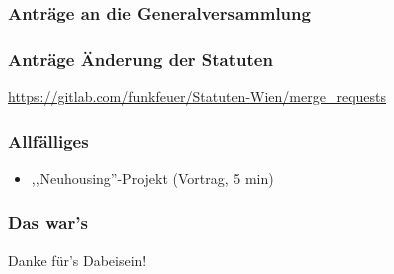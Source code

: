 \documentclass[17pt]{beamer} %
\begin{document}
\begin{frame}
	\frametitle{Anträge an die Generalversammlung}
\end{frame}



\begin{frame}
	\frametitle{Anträge Änderung der Statuten}
	\url{https://gitlab.com/funkfeuer/Statuten-Wien/merge_requests}
\end{frame}



\begin{frame}
	\frametitle{Allfälliges}
	\begin{itemize}
		\item ,,Neuhousing''-Projekt (Vortrag, 5 min)
	\end{itemize}
\end{frame}



\begin{frame}
	\frametitle{Das war's}
	Danke für's Dabeisein!
\end{frame}

\end{document}
